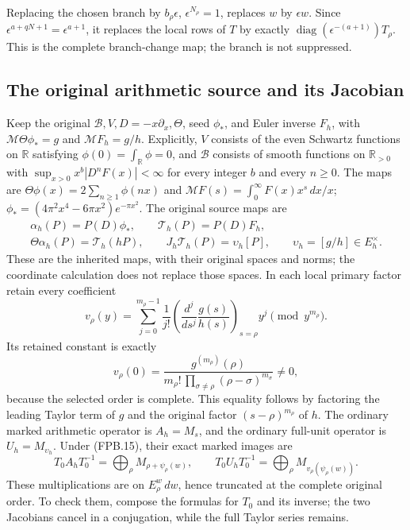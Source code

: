 Replacing the chosen branch by \(b_\rho\epsilon\),
\(\epsilon^{N_\rho}=1\), replaces \(w\) by \(\epsilon w\).
Since \(\epsilon^{a+qN+1}=\epsilon^{a+1}\), it replaces the local
rows of \(T\) by exactly
\(\operatorname{diag}(\epsilon^{-(a+1)})T_\rho\).
This is the complete branch-change map; the branch is not suppressed.

\subsection{The original arithmetic source and its Jacobian}

Keep the original \(\mathscr B,V,D=-x\partial_x,\Theta\), seed
\(\phi_*\), and Euler inverse \(F_h\), with
\(\mathcal M\Theta\phi_*=g\) and \(\mathcal M F_h=g/h\).
Explicitly, \(V\) consists of the even Schwartz functions on
\(\mathbb{R}\) satisfying \(\phi(0)=\int_{\mathbb{R}}\phi=0\),
and \(\mathscr B\) consists of smooth functions on
\(\mathbb{R}_{>0}\) with
\(\sup_{x>0}x^b|D^nF(x)|<\infty\) for every integer \(b\)
and every \(n\ge0\). The maps are
\(\Theta\phi(x)=2\sum_{n\ge1}\phi(nx)\) and
\(\mathcal MF(s)=\int_0^\infty F(x)x^s\,dx/x\);
\(\phi_*=(4\pi^2x^4-6\pi x^2)e^{-\pi x^2}\).
The original source maps are
\[
 \begin{gathered}
 \alpha_h(P)=P(D)\phi_*,\qquad
 \mathcal T_h(P)=P(D)F_h,\\
 \Theta\alpha_h(P)=\mathcal T_h(hP),\qquad
 J_h\mathcal T_h(P)=\upsilon_h[P],
 \qquad \upsilon_h=[g/h]\in E_h^\times.
 \end{gathered}
 \tag{FPB.26}\label{GraphV2:eq:fpb-theta}
\]
These are the inherited maps, with their original spaces and norms;
the coordinate calculation does not replace those spaces. In each
local primary factor retain every coefficient
\[
 v_\rho(y)=\sum_{j=0}^{m_\rho-1}
    \frac1{j!}\left(\frac{d^j}{ds^j}\frac{g(s)}{h(s)}
             \right)_{s=\rho}y^j\pmod {y^{m_\rho}}.
 \tag{FPB.27}\label{GraphV2:eq:fpb-unit}
\]
Its retained constant is exactly
\[
 v_\rho(0)=\frac{g^{(m_\rho)}(\rho)}
  {m_\rho!\,\prod_{\sigma\ne\rho}(\rho-\sigma)^{m_\sigma}}
  \ne0,
\]
because the selected order is complete. This equality follows by
factoring the leading Taylor term of \(g\) and the original factor
\((s-\rho)^{m_\rho}\) of \(h\).
The ordinary marked arithmetic operator is \(A_h=M_s\), and
the ordinary full-unit operator is \(U_h=M_{\upsilon_h}\).
Under (FPB.15), their exact marked images are
\[
 T_0A_hT_0^{-1}=\bigoplus_\rho M_{\rho+\psi_\rho(w)},\qquad
 T_0U_hT_0^{-1}=\bigoplus_\rho M_{v_\rho(\psi_\rho(w))}.
 \tag{FPB.28}\label{GraphV2:eq:fpb-marked-arithmetic}
\]
These multiplications are on \(E_\rho^w\,dw\), hence truncated
at the complete original order. To check them, compose the formulas
for \(T_0\) and its inverse; the two Jacobians cancel in a
conjugation, while the full Taylor series remains.

